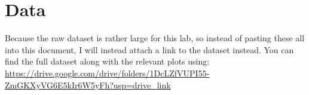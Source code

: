 \documentclass[10pt]{article}
\begin{document}
	\pagebreak

	\section{Data}
	Because the raw dataset is rather large for this lab, so instead of pasting these all into this document,
	I will instead attach a link to the dataset instead. You can find the full dataset along with the
	relevant plots using:
	\url{https://drive.google.com/drive/folders/1DcLZfVUPI55-ZmGKXyVG6E5kIr6W5yFh?usp=drive_link}
\end{document}

